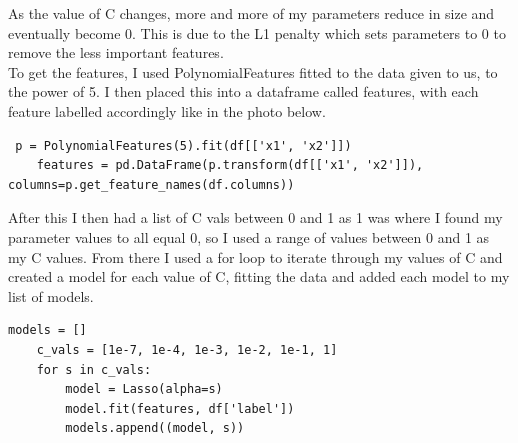 \documentclass[11pt]{article} %
\begin{document}
As the value of C changes, more and more of my parameters reduce in size and eventually become 0. This is due to the L1 penalty which sets parameters to 0 to remove the less important features.
\\To get the features, I used PolynomialFeatures fitted to the data given to us, to the power of 5. I then placed this into a dataframe called features, with each feature labelled accordingly like in the photo below.
\begin{verbatim}
 p = PolynomialFeatures(5).fit(df[['x1', 'x2']])
    features = pd.DataFrame(p.transform(df[['x1', 'x2']]), columns=p.get_feature_names(df.columns))
\end{verbatim}
After this I then had a list of C vals between 0 and 1 as 1 was where I found my parameter values to all equal 0, so I used a range of values between 0 and 1 as my C values. From there I used a for loop to iterate through my values of C and created a model for each value of C, fitting the data and added each model to my list of models. 
\begin{verbatim}
models = []
    c_vals = [1e-7, 1e-4, 1e-3, 1e-2, 1e-1, 1]
    for s in c_vals:
        model = Lasso(alpha=s)
        model.fit(features, df['label'])
        models.append((model, s))
\end{verbatim}
\newpage
\end{document}
